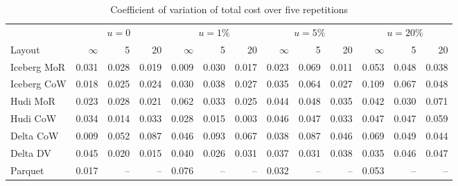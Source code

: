 \begin{table}[!t]\centering
\caption{Coefficient of variation of total cost over five repetitions}\label{tab:a-cv}
\footnotesize
\begin{tabular}{@{}lrrrrrrrrrrrr@{}}\toprule
 & \multicolumn{3}{c}{$u=0$} & \multicolumn{3}{c}{$u=1\%$} & \multicolumn{3}{c}{$u=5\%$} & \multicolumn{3}{c}{$u=20\%$}\\
\cmidrule(lr){2-4}\cmidrule(lr){5-7}\cmidrule(lr){8-10}\cmidrule(lr){11-13}
Layout & $\infty$ & 5 & 20 & $\infty$ & 5 & 20 & $\infty$ & 5 & 20 & $\infty$ & 5 & 20\\\midrule
Iceberg MoR & 0.031 & 0.028 & 0.019 & 0.009 & 0.030 & 0.017 & 0.023 & 0.069 & 0.011 & 0.053 & 0.048 & 0.038\\
Iceberg CoW & 0.018 & 0.025 & 0.024 & 0.030 & 0.038 & 0.027 & 0.035 & 0.064 & 0.027 & 0.109 & 0.067 & 0.048\\
Hudi MoR & 0.023 & 0.028 & 0.021 & 0.062 & 0.033 & 0.025 & 0.044 & 0.048 & 0.035 & 0.042 & 0.030 & 0.071\\
Hudi CoW & 0.034 & 0.014 & 0.033 & 0.028 & 0.015 & 0.003 & 0.046 & 0.047 & 0.033 & 0.047 & 0.047 & 0.059\\
Delta CoW & 0.009 & 0.052 & 0.087 & 0.046 & 0.093 & 0.067 & 0.038 & 0.087 & 0.046 & 0.069 & 0.049 & 0.044\\
Delta DV & 0.045 & 0.020 & 0.015 & 0.040 & 0.026 & 0.031 & 0.037 & 0.031 & 0.038 & 0.035 & 0.046 & 0.047\\
Parquet & 0.017 & -- & -- & 0.076 & -- & -- & 0.032 & -- & -- & 0.053 & -- & --\\\bottomrule
\end{tabular}
\end{table}
